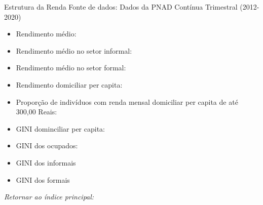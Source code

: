 \begin{frame}[label=_estrutura_renda]{Estrutura da Renda}
{\footnotesize Fonte de dados: Dados da PNAD Contínua Trimestral (2012-2020)}
\begin{footnotesize}
\begin{itemize}
\item{Rendimento médio: \hyperlink{_estrutura_renda_rendimento_medio_total}{}}
\item{Rendimento médio no setor informal: \hyperlink{_estrutura_renda_rendimento_medio_informal}{}}
\item{Rendimento médio no setor formal: \hyperlink{_estrutura_renda_rendimento_medio_formal}{}}
\item{Rendimento domiciliar per capita: \hyperlink{_estrutura_renda_rendimento_domiciliar_pc}{}}

\item{Proporção de indivíduos com renda mensal domiciliar per capita de até 300,00 Reais: \hyperlink{_estrutura_renda_prop_rendimento_domiciliar_BF}{}}

\item{GINI dominciliar per capita: \hyperlink{_estrutura_renda_gini_rendimento_domiciliar_pc}{}}
\item{GINI dos ocupados: \hyperlink{_estrutura_renda_gini_ocupado}{}}
\item{GINI dos informais \hyperlink{_estrutura_renda_gini_informal}{}}
\item{GINI dos formais \hyperlink{_estrutura_renda_gini_formal}{}}
\end{itemize}
\end{footnotesize}

\begin{small}
\textit{Retornar ao índice principal: \hyperlink{indice_principal}{} }
\end{small}

\end{frame}

